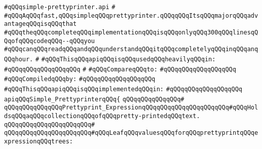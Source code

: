 \label{src/lib/prettyprint/simple/simple-prettyprinter.api}
\verb|#qQQqsimple-prettyprinter.api|\newline
\verb|#|\newline
\verb|#qQQqAqQQqfast,qQQqsimpleqQQqprettyprinter.qQQqqQQqItsqQQqmajorqQQqadvantageqQQqisqQQqthat|\newline
\verb|#qQQqtheqQQqcompleteqQQqimplementationqQQqisqQQqonlyqQQq300qQQqlinesqQQqofqQQqcodeqQQq--qQQqyou|\newline
\verb|#qQQqcanqQQqreadqQQqandqQQqunderstandqQQqitqQQqcompletelyqQQqinqQQqanqQQqhour.|\newline
\verb|#|\newline
\verb|#qQQqThisqQQqapiqQQqisqQQqusedqQQqheavilyqQQqin:|\newline
\verb|#qQQqqQQqqQQqqQQqqQQq|\newline
\verb|#|\newline
\verb|#qQQqCompareqQQqto:|\newline
\verb|#qQQqqQQqqQQqqQQqqQQq|\newline
\newline
\verb|#qQQqCompiledqQQqby:|\newline
\verb|#qQQqqQQqqQQqqQQqqQQq|\newline
\newline
\newline
\verb|#qQQqThisqQQqapiqQQqisqQQqimplementedqQQqin:|\newline
\verb|#qQQqqQQqqQQqqQQqqQQq|\newline
\newline
\verb|apiqQQqSimple_PrettyprinterqQQq{|\newline
\verb|qQQqqQQqqQQqqQQq#|\newline
\verb|qQQqqQQqqQQqqQQqPrettyprint_ExpressionqQQqqQQqqQQqqQQqqQQqqQQq#qQQqHoldsqQQqaqQQqcollectionqQQqofqQQqpretty-printedqQQqtext.|\newline
\verb|qQQqqQQqqQQqqQQqqQQqqQQq#|\newline
\verb|qQQqqQQqqQQqqQQqqQQqqQQq#qQQqLeafqQQqvaluesqQQqforqQQqprettyprintqQQqexpressionqQQqtrees:|\newline
